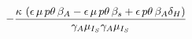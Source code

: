 \begin{equation}
    -
    \frac{
        \kappa\,
        \left(
            \epsilon\,\mu\,p\theta\,\beta_{{A}}-\epsilon
            \, \mu\,p\theta\, \beta_{{s}}+\epsilon \,
            p\theta\,\beta_{{A}}\delta_{{H}}
        \right)
    }{%
        \gamma_{{A}} \mu_{I_S}
        \gamma_{{A}}
        \mu_{I_S}
    }
\end{equation}
